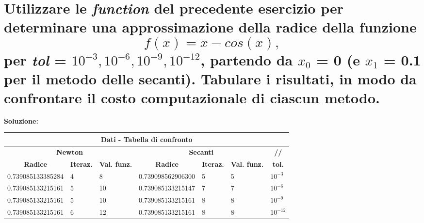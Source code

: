 \documentclass[10pt,a4paper]{article}
\begin{document}
\section{Utilizzare le \textit{function} del precedente esercizio per determinare una approssimazione
  della radice della funzione $$ f(x) = x - cos(x), $$ per \textit{tol} = $ 10^{-3}, 10^{-6}, 10^{-9}, 10^{-12} $,
  partendo da $ x_0 $ = 0 (e $ x_1 $ = 0.1 per il metodo delle secanti).
  Tabulare i risultati, in modo da confrontare il costo computazionale di ciascun metodo.}
\textbf{Soluzione:}
\begin{center}
  \setlength\tabcolsep{2pt}
  \begin{tabular}{|p{3.5cm} | p{1cm} | p{1cm} | p{3.5cm} | p{1cm} | p{1cm} | p{1cm}|}
    \hline
    \multicolumn{7}{|c|}{\textbf{Dati - Tabella di confronto}}                                                                                                                                    \\
    \hline
    \multicolumn{3}{|c|}{\textbf{Newton}} & \multicolumn{3}{|c|}{\textbf{Secanti}} & \multicolumn{1}{c|}{\textbf{//}}                                                                             \\
    \hline
    \multicolumn{1}{|c|}{\textbf{Radice}} & \multicolumn{1}{|c|}{\textbf{Iteraz.}} & \multicolumn{1}{|c|}{\textbf{Val. funz.}}
                                          & \multicolumn{1}{|c|}{\textbf{Radice}}  & \multicolumn{1}{|c|}{\textbf{Iteraz.}}    & \multicolumn{1}{|c|}{\textbf{Val. funz.}}
                                          & \multicolumn{1}{c|}{\textbf{tol.}}                                                                                                                    \\
    \hline
    0.739085133385284                     & 4                                      & 8                                         & 0.739098562906300                         & 5 & 5 & $ 10^{-3} $  \\
    0.739085133215161                     & 5                                      & 10                                        & 0.739085133215147                         & 7 & 7 & $ 10^{-6} $  \\
    0.739085133215161                     & 5                                      & 10                                        & 0.739085133215161                         & 8 & 8 & $ 10^{-9} $  \\
    0.739085133215161                     & 6                                      & 12                                        & 0.739085133215161                         & 8 & 8 & $ 10^{-12} $ \\
    \hline
  \end{tabular}
  \newline
\end{center}
\end{document}
